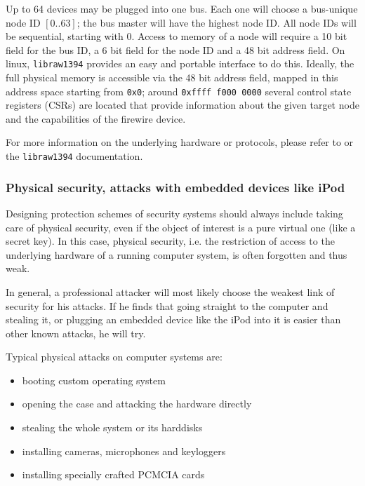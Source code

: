 Up to 64 devices may be plugged into one bus. Each one will choose a bus-unique
node ID $[0..63]$; the bus master will have the highest node ID. All node IDs
will be sequential, starting with 0. Access to memory of a node will require a
10 bit field for the bus ID, a 6 bit field for the node ID and a 48 bit address
field.  On linux, \texttt{libraw1394} provides an easy and portable interface to
do this. Ideally, the full physical memory is accessible via the 48 bit address
field, mapped in this address space starting from \texttt{0x0}; around
\texttt{0xffff~f000~0000} several control state registers (CSRs) are located
that provide information about the given target node and the capabilities of the
firewire device.

For more information on the underlying hardware or protocols, please refer to
\cite{OHCIspecs:2000,fwire_sys_arch:2222} or the \texttt{libraw1394}
documentation.



\subsubsection{Physical security, attacks with embedded devices like iPod}

Designing protection schemes of security systems should always include taking
care of physical security, even if the object of interest is a pure virtual one
(like a secret key). In this case, physical security, i.e. the restriction of
access to the underlying hardware of a running computer system, is often
forgotten and thus weak.

In general, a professional attacker will most likely choose the weakest link of
security for his attacks. If he finds that going straight to the computer and
stealing it, or plugging an embedded device like the iPod into it is easier than
other known attacks, he will try.

Typical physical attacks on computer systems are:

\begin{itemize}

	\item booting custom operating system

	\item opening the case and attacking the hardware directly

	\item stealing the whole system or its harddisks

	\item installing cameras, microphones and keyloggers

	\item installing specially crafted PCMCIA cards

\end{itemize}

